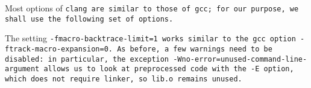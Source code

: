 Most options of \tt{clang} are similar to those of \tt{gcc};
for our purpose, we shall use the following set of options.


The setting \tt{-fmacro-backtrace-limit=1} works similar
to the \tt{gcc} option \tt{-ftrack-macro-expansion=0}.
As before, a few warnings need to be disabled: in particular,
the exception \tt{-Wno-error=unused-command-line-argument}
allows us to look at preprocessed code with the \tt{-E} option,
which does not require linker, so \tt{lib.o} remains unused.
